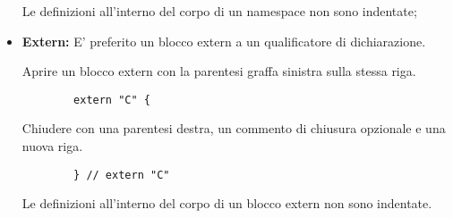 \documentclass[../NomeDocumento.tex]{subfiles}
\begin{document}
\begin{itemize}
		Le definizioni all'interno del corpo di un namespace non sono indentate;
		
		\item \textbf{Extern:} E' preferito un blocco extern a un qualificatore di dichiarazione.
		
		Aprire un blocco extern con la parentesi graffa sinistra sulla stessa riga.
		
		\begin{verbatim}
		extern "C" {
		\end{verbatim}
		
		Chiudere con una parentesi destra, un commento di chiusura opzionale e una nuova riga.
		
		\begin{verbatim}
		} // extern "C"
		\end{verbatim}
		
		Le definizioni all'interno del corpo di un blocco extern non sono indentate.
	
	\end{itemize}
	
\end{document}
